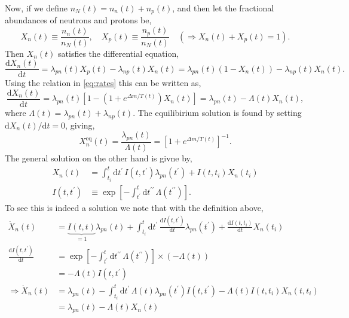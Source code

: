 \documentclass[11pt]{article}
\numberwithin{equation}{section}
\numberwithin{figure}{section}
\numberwithin{table}{section}
\begin{document}
Now, if we define $n_N(t) = n_n(t) + n_p(t)$, and then let the fractional abundances of neutrons and protons be,
\begin{equation}
X_n(t) \equiv \frac{n_n(t)}{n_N(t)}, \quad X_p(t) \equiv \frac{n_p(t)}{n_N(t)} \quad (\Rightarrow X_n(t) + X_p(t) = 1).
\end{equation}
Then $X_n(t)$ satisfies the differential equation,
\begin{equation}
\frac{\mathrm{d}X_n(t)}{\mathrm{d}t} = \lambda_{pn}(t) X_p(t) - \lambda_{np}(t) X_n(t) = \lambda_{pn}(t)\left(1 - X_n(t)\right) - \lambda_{np}(t)X_n(t).
\end{equation}
Using the relation in \eqref{eq:rates} this can be written as,
\begin{equation}
\frac{\mathrm{d}X_n(t)}{\mathrm{d}t} = \lambda_{pn}(t) \left[ 1 - \left(1 + e^{\Delta m/T(t)}\right)X_n(t)\right] = \lambda_{pn}(t) - \Lambda(t) X_n(t),
\end{equation}
where $\Lambda(t) = \lambda_{pn}(t) + \lambda_{np}(t)$. The equilibirium solution is found by setting $\mathrm{d}X_n(t)/\mathrm{d}t = 0$, giving,
\begin{equation}
X_n^{\mathrm{eq}}(t) = \frac{\lambda_{pn}(t)}{\Lambda(t)} = \left[1 + e^{\Delta m/T(t)}\right]^{-1}.
\end{equation}
The general solution on the other hand is givne by,
\begin{align}
X_n(t) &= \int_{t_i}^{t}{\mathrm{d}t^{\prime} \, I(t, t^{\prime}) \lambda_{pn}(t^{\prime})} + I(t, t_i) X_n(t_i) \label{eq:xn}\\
I(t, t^{\prime}) &\equiv \exp\left[-\int_{t^{\prime}}^{t}{\mathrm{d}t^{\prime \prime}\,\Lambda(t^{\prime\prime})}\right]. \label{eq:It}
\end{align}
To see this is indeed a solution we note that with the definition above,
\begin{align*}
\dot{X}_n(t) &= \underbrace{I(t, t)}_{=1}\lambda_{pn}(t) + \int_{t_i}^{t}{\mathrm{d}t^{\prime} \, \frac{\mathrm{d}I(t, t^{\prime})}{\mathrm{d}t}\lambda_{pn}(t^{\prime})} + \frac{\mathrm{d}I(t, t_i)}{\mathrm{d}t}X_n(t_i) \\
\frac{\mathrm{d}I(t, t^{\prime})}{\mathrm{d}t} &= \exp\left[-\int_{t^{\prime}}^{t}{\mathrm{d}t^{\prime\prime}\,\Lambda(t^{\prime\prime})}\right] \times \left(-\Lambda(t)\right) \\
&= -\Lambda(t) I(t, t^{\prime}) \\
\Rightarrow \dot{X}_n(t) &= \lambda_{pn}(t) - \int_{t_i}^{t}{\mathrm{d}t^{\prime}\,\Lambda(t)\lambda_{pn}(t^{\prime}) I(t, t^{\prime})} - \Lambda(t)I(t, t_i)X_n(t, t_i) \\
&= \lambda_{pn}(t) - \Lambda(t)X_n(t)
\end{align*}
\end{document}
